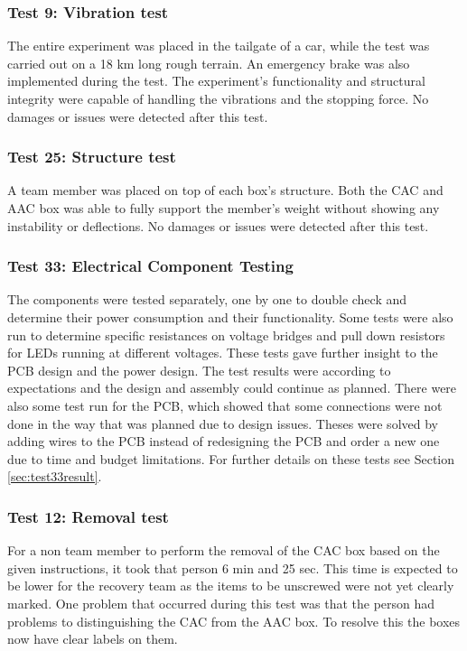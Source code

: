 \subsubsection{Test 9: Vibration test}
The entire experiment was placed in the tailgate of a car, while the test was carried out on a 18 km long rough terrain. An emergency brake was also implemented during the test. The experiment's functionality and structural integrity were capable of handling the vibrations and the stopping force.
No damages or issues were detected after this test. 

\subsubsection{Test 25: Structure test}
A team member was placed on top of each box's structure. Both the CAC and AAC box was able to fully support the member's weight without showing any instability or deflections. No damages or issues were detected after this test. 

\subsubsection{Test 33: Electrical Component Testing}
\label{sec:Test33Test-Electronical-Component-Testing}
The components were tested separately, one by one to double check and determine their power consumption and their functionality. Some tests were also run to determine specific resistances on voltage bridges and pull down resistors for LEDs running at different voltages. These tests gave further insight to the PCB design and the power design. The test results were according to expectations and the design and assembly could continue as planned. There were also some test run for the PCB, which showed that some connections were not done in the way that was planned due to design issues. Theses were solved by adding wires to the PCB instead of redesigning the PCB and order a new one due to time and budget limitations. For further details on these tests see Section \ref{sec:test33result}.

\subsubsection{Test 12: Removal test}
For a non team member to perform the removal of the CAC box based on the given instructions, it took that person 6 min and 25 sec. This time is expected to be lower for the recovery team as the items to be unscrewed were not yet clearly marked. One problem that occurred during this test was that the person had problems to distinguishing the CAC from the AAC box. To resolve this the boxes now have clear labels on them.

